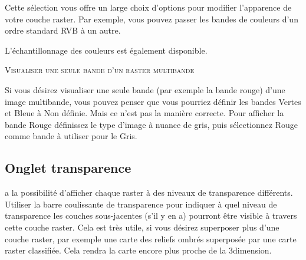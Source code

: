 
Cette sélection vous offre un large choix d'options pour modifier l'apparence de votre couche raster. Par exemple, vous pouvez passer les bandes de couleurs d'un ordre standard RVB à un autre.

L'échantillonnage des couleurs est également disponible.

\begin{Tip}\caption{\textsc{Visualiser une seule bande d'un raster multibande}}
Si vous désirez visualiser une seule bande (par exemple la bande rouge)
d'une image multibande, vous pouvez penser que vous pourriez définir les bandes Vertes et Bleue à \og Non définie\fg. Mais ce n'est pas la manière correcte. Pour afficher la bande Rouge définissez le type d'image à nuance de gris, puis sélectionnez Rouge comme bande à utiliser pour le Gris.
\end{Tip} 

\subsection{Onglet transparence} \label{rastertab:transparency}

\qg a la possibilité d'afficher chaque raster à des niveaux de transparence
différents. Utiliser la barre coulissante de transparence pour indiquer à quel niveau de transparence les couches sous-jacentes (s'il y en a) pourront être visible à travers cette couche raster. Cela est très utile, si vous désirez superposer plus d'une couche raster, par exemple une carte des reliefs ombrés superposée par une carte raster classifiée. Cela rendra la carte encore plus proche de la 3\ieme dimension.

